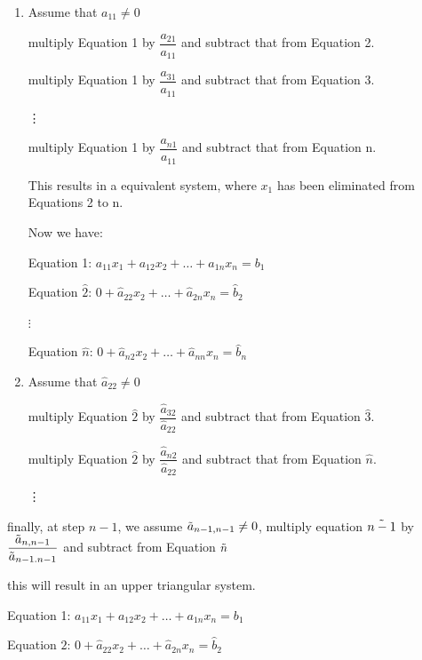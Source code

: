 \documentclass{article}
\begin{document}
\begin{enumerate}
    \item Assume that $a_11 \neq 0$
    
        multiply Equation 1 by $\dfrac{a_{21}}{a_{11}}$ and subtract that from Equation 2.
        
        multiply Equation 1 by $\dfrac{a_{31}}{a_{11}}$ and subtract that from Equation 3.
         
        \hspace{3cm} \vdots
        
        multiply Equation 1 by $\dfrac{a_{n1}}{a_{11}}$ and subtract that from Equation n.
        
        This results in a equivalent system, where $x_1$ has been eliminated from Equations 2 to n.
        
\pagebreak

\text{}

Now we have:

Equation 1: $a_{11} x_1 + a_{12} x_2 + \dots + a_{1n} x_n = b_1$

Equation $\hat{2}$: $0 + \hat{a}_{22} x_2 + \dots + \hat{a}_{2n} x_n = \hat{b}_2$

 \hspace{2cm} $\vdots$

Equation $\hat{n}$: $0 + \hat{a}_{n2} x_2 + \dots + \hat{a}_{nn} x_n = \hat{b}_n$

\item Assume that $\hat{a}_{22} \neq 0$
        
        multiply Equation $\hat{2}$ by $\dfrac{\hat{a}_{32}}{\hat{a}_{22}}$ and subtract that from Equation $\hat{3}$.
        
        multiply Equation $\hat{2}$ by $\dfrac{\hat{a}_{n2}}{\hat{a}_{22}}$ and subtract that from Equation $\hat{n}$.
        
\vdots

\end{enumerate}

finally, at step $n - 1$, we assume $\Tilde{a}_{n - 1,n - 1} \neq 0$, multiply equation $\Tilde{n - 1}$ by $\dfrac{\Tilde{a}_{n,n - 1}}{\Tilde{a}_{n-1.n-1}}$ and subtract from Equation $\Tilde{n}$

this will result in an upper triangular system.

Equation 1: $a_{11} x_1 + a_{12} x_2 + \dots + a_{1n} x_n = b_1$

Equation $\hat{2}$: $0 + \hat{a}_{22} x_2 + \dots + \hat{a}_{2n} x_n = \hat{b}_2$
\end{document}
